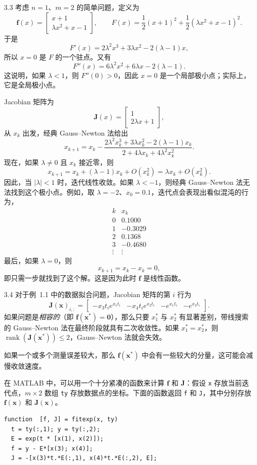 \begin{example}{3.3}
考虑 $n=1$、$m=2$ 的简单问题，定义为
\[
  \mathbf{f}(x)=\begin{bmatrix}x+1\\\lambda x^2+x-1\end{bmatrix},
  \qquad
  F(x)=\frac12(x+1)^2+\frac12(\lambda x^2+x-1)^2.
\]
于是
\[
  F'(x)=2\lambda^2x^3+3\lambda x^2-2(\lambda-1)x,
\]
所以 $x=0$ 是 $F$ 的一个驻点。又有
\[
  F''(x)=6\lambda^2x^2+6\lambda x-2(\lambda-1).
\]
这说明，如果 $\lambda<1$，则 $F''(0)>0$，因此 $x=0$ 是一个局部极小点；实际上，它是全局极小点。

Jacobian 矩阵为
\[
  \mathbf{J}(x)=\begin{bmatrix}1\\2\lambda x+1\end{bmatrix},
\]
从 $x_k$ 出发，经典 Gauss--Newton 法给出
\[
  x_{k+1}=x_k-
  \frac{2\lambda^2x_k^3+3\lambda x_k^2-2(\lambda-1)x_k}
       {2+4\lambda x_k+4\lambda^2x_k^2}.
\]
现在，如果 $\lambda\ne0$ 且 $x_k$ 接近零，则
\[
  x_{k+1}=x_k+(\lambda-1)x_k+O(x_k^2)
  =\lambda x_k+O(x_k^2).
\]
因此，当 $|\lambda|<1$ 时，迭代线性收敛。如果 $\lambda<-1$，则经典 Gauss--Newton 法无法找到这个极小点。例如，取 $\lambda=-2$、$x_0=0.1$，迭代点会表现出看似混沌的行为，
\[
  \begin{array}{r|r}
    k&x_k\\\hline
    0&0.1000\\
    1&-0.3029\\
    2&0.1368\\
    3&-0.4680\\
    \vdots&\vdots
  \end{array}
\]
最后，如果 $\lambda=0$，则
\[
  x_{k+1}=x_k-x_k=0,
\]
即只需一步就找到了这个解。这是因为此时 $\mathbf{f}$ 是线性函数。
\end{example}

\begin{example}{3.4}
对于例~1.1 中的数据拟合问题，Jacobian 矩阵的第 $i$ 行为
\[
  \mathbf{J}(\mathbf{x})_{i,:}
  =\begin{bmatrix}
    -x_3t_i e^{x_1t_i}&-x_4t_i e^{x_2t_i}&-e^{x_1t_i}&-e^{x_2t_i}
  \end{bmatrix}.
\]
如果问题是\emph{相容的}（即 $\mathbf{f}(\mathbf{x}^*)=\mathbf{0}$），那么只要 $x_1^*$ 与 $x_2^*$ 有显著差别，带线搜索的 Gauss--Newton 法在最终阶段就具有二次收敛性。如果 $x_1^*=x_2^*$，则 $\operatorname{rank}(\mathbf{J}(\mathbf{x}^*))\leq2$，Gauss--Newton 法就会失效。

如果一个或多个测量误差较大，那么 $\mathbf{f}(\mathbf{x}^*)$ 中会有一些较大的分量，这可能会减慢收敛速度。

在 MATLAB 中，可以用一个十分紧凑的函数来计算 $\mathbf{f}$ 和 $\mathbf{J}$：假设 \texttt{x} 存放当前迭代点，$m\times2$ 数组 \texttt{ty} 存放数据点的坐标。下面的函数返回 \texttt{f} 和 \texttt{J}，其中分别存放 $\mathbf{f}(\mathbf{x})$ 和 $\mathbf{J}(\mathbf{x})$。
\begin{verbatim}
function  [f, J] = fitexp(x, ty)
  t = ty(:,1); y = ty(:,2);
  E = exp(t * [x(1), x(2)]);
  f = y - E*[x(3); x(4)];
  J = -[x(3)*t.*E(:,1), x(4)*t.*E(:,2), E];
\end{verbatim}
\end{example}
